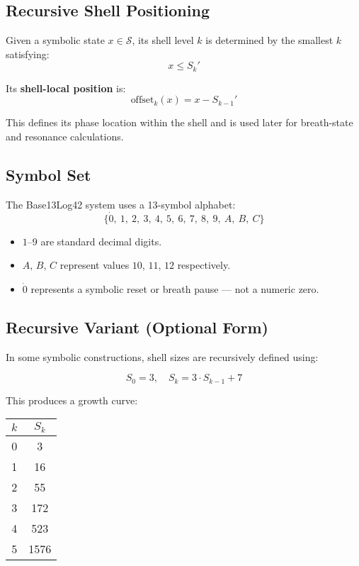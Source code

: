 \subsection*{Recursive Shell Positioning}

Given a symbolic state $x \in \mathcal{S}$, its shell level $k$ is determined by the smallest $k$ satisfying:
\[
x \leq S_k'
\]

Its \textbf{shell-local position} is:
\[
\text{offset}_k(x) = x - S_{k-1}'
\]

This defines its phase location within the shell and is used later for breath-state and resonance calculations.

\subsection*{Symbol Set}

The Base13Log42 system uses a 13-symbol alphabet:
\[
\{ \dot{0},\ 1,\ 2,\ 3,\ 4,\ 5,\ 6,\ 7,\ 8,\ 9,\ A,\ B,\ C \}
\]

\begin{itemize}
  \item $1$–$9$ are standard decimal digits.
  \item $A$, $B$, $C$ represent values $10$, $11$, $12$ respectively.
  \item $\dot{0}$ represents a symbolic reset or breath pause — not a numeric zero.
\end{itemize}

\subsection*{Recursive Variant (Optional Form)}

In some symbolic constructions, shell sizes are recursively defined using:

\[
S_0 = 3,\quad S_k = 3 \cdot S_{k-1} + 7
\]

This produces a growth curve:

\begin{center}
\begin{tabular}{|c|c|}
\hline
\textbf{$k$} & \textbf{$S_k$} \\
\hline
0 & 3 \\
1 & 16 \\
2 & 55 \\
3 & 172 \\
4 & 523 \\
5 & 1576 \\
\hline
\end{tabular}
\end{center}

